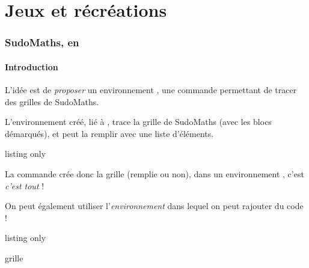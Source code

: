 \part{Jeux et récréations}

\section{SudoMaths, en \TikZ}\label{sudomaths}

\subsection{Introduction}

\begin{tipblock}
L'idée est de \textit{proposer} un environnement \TikZ, une commande permettant de tracer des grilles de SudoMaths.

L'environnement créé, lié à \TikZ, trace la grille de SudoMaths (avec les blocs démarqués), et peut la remplir avec une liste d'éléments.
\end{tipblock}

\begin{PresCodeTexPL}{listing only}
\SudoMaths{}
\end{PresCodeTexPL}

\begin{PresCodePL}{}
\SudoMaths{}
\end{PresCodePL}

\begin{noteblock}
La commande  crée donc la grille (remplie ou non), dans un environnement \TikZ, c'est \textit{c'est tout} ! 

\smallskip

On peut également utiliser l'\textit{environnement}  dans lequel on peut rajouter du code \TikZ{} !
\end{noteblock}

\begin{PresCodeTexPL}{listing only}

\begin{EnvSudoMaths}[clés]{grille}
\end{EnvSudoMaths}
\end{PresCodeTexPL}

\pagebreak


